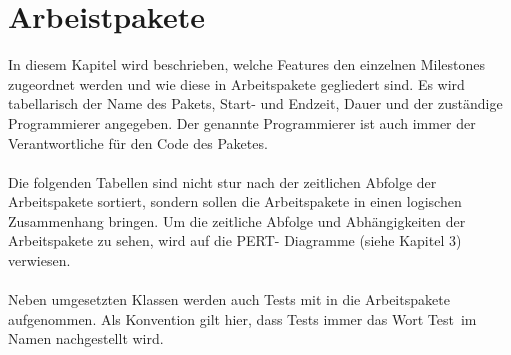 \chapter{Arbeistpakete}
In diesem Kapitel wird beschrieben, welche Features den einzelnen Milestones zugeordnet werden und wie diese in Arbeitspakete gegliedert sind. Es
wird tabellarisch der Name des Pakets, Start- und Endzeit, Dauer und der zuständige
Programmierer angegeben. Der genannte Programmierer ist auch immer der Verantwortliche
für den Code des Paketes.\\
\ \\
Die folgenden Tabellen sind nicht stur nach der zeitlichen Abfolge der Arbeitspakete sortiert,
sondern sollen die Arbeitspakete in einen logischen Zusammenhang bringen. Um die
zeitliche Abfolge und Abhängigkeiten der Arbeitspakete zu sehen, wird auf die PERT-
Diagramme (siehe Kapitel 3) verwiesen.\\
\ \\
Neben umgesetzten Klassen werden auch Tests mit in die Arbeitspakete aufgenommen.
Als Konvention gilt hier, dass Tests immer das Wort
\glqq Test\grqq \ im Namen nachgestellt wird.


